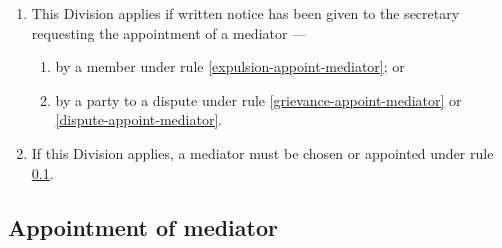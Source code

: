 \documentclass[../constitution.tex]{subfiles}
\begin{document}
\begin{enumerate}

  \item This Division applies if written notice has been given to the secretary requesting the appointment of a mediator ---

        \begin{enumerate}

          \item by a member under rule \ref{expulsion-appoint-mediator}; or
          \item by a party to a dispute under rule \ref{grievance-appoint-mediator} or \ref{dispute-appoint-mediator}.
        \end{enumerate}
  \item If this Division applies, a mediator must be chosen or appointed under rule \ref{appointment-of-mediator}.
\end{enumerate}

\hypertarget{appointment-of-mediator-1}{%
  \subsection{Appointment of mediator}\label{appointment-of-mediator}}
\end{document}
